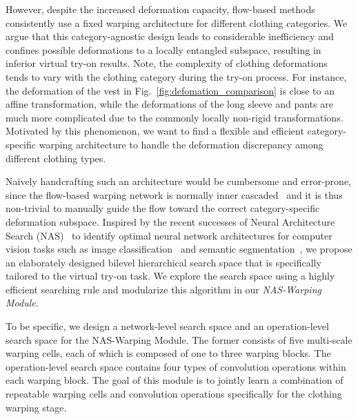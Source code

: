 \documentclass[sigconf]{acmart}
\begin{document}
However, despite the increased deformation capacity, flow-based methods consistently use a fixed warping architecture for different clothing categories. We argue that this category-agnostic design leads to considerable inefficiency and confines possible deformations to a locally entangled subspace, resulting in inferior virtual try-on results. 
Note, the complexity of clothing deformations tends to vary with the clothing category during the try-on process. For instance, the deformation of the vest in Fig.~\ref{fig:defomation_comparison} is close to an affine transformation, while the deformations of the long sleeve and pants are much more complicated due to the commonly locally non-rigid transformations.
Motivated by this phenomenon, we want to find a flexible and efficient category-specific warping architecture to handle the deformation discrepancy among different clothing types.

Naively handcrafting such an architecture would be cumbersome and error-prone, since the flow-based warping network is normally inner cascaded~\cite{xintong2019clothflow} and it is thus non-trivial to manually guide the flow toward the correct category-specific deformation subspace. 
Inspired by the recent successes of Neural Architecture Search (NAS)~\cite{nas_survey} to identify optimal neural network architectures for computer vision tasks such as image classification~\cite{liu2018dasrts,bender2018oneshot,zichao2019singlepath,xu2019pc-darts,li2020dna,tan2019efficientnet} and semantic segmentation~\cite{liu2019auto-deeplab,zhang2019cas}, we propose an elaborately designed bilevel hierarchical search space that is specifically tailored to the virtual try-on task. We explore the search space using a highly efficient searching rule and modularize this algorithm in our \emph{NAS-Warping Module}.

To be specific, we design a network-level search space and an operation-level search space for the NAS-Warping Module. The former consists of five multi-scale warping cells, each of which is composed of one to three warping blocks. The operation-level search space contains four types of convolution operations within each warping block. The goal of this module is to jointly learn a combination of repeatable warping cells and convolution operations specifically for the clothing warping stage. 
\end{document}
